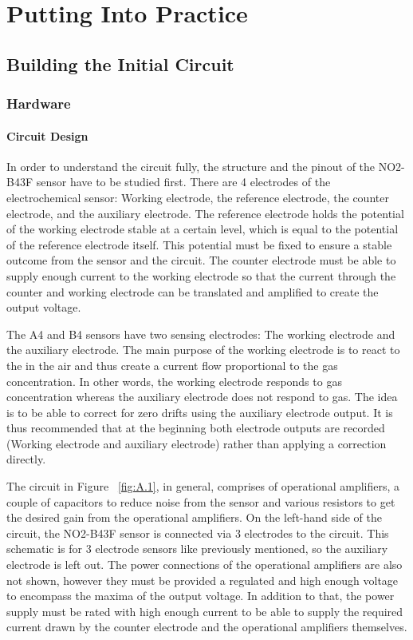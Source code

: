 \chapter{Putting Into Practice}

\section{Building the Initial Circuit}

\subsection{Hardware}
\subsubsection{Circuit Design}
In order to understand the circuit fully, the structure and the pinout of the NO2-B43F sensor have to be studied first. There are 4 electrodes of the electrochemical sensor: Working electrode, the reference electrode, the counter electrode, and the auxiliary electrode. The reference electrode holds the potential of the working electrode stable at a certain level, which is equal to the potential of the reference electrode itself. This potential must be fixed to ensure a stable outcome from the sensor and the circuit. The counter electrode must be able to supply enough current to the working electrode so that the current through the counter and working electrode can be translated and amplified to create the output voltage.\par
The A4 and B4 sensors have two sensing electrodes: The working electrode and the auxiliary electrode. The main purpose of the working electrode is to react to the  in the air and thus create a current flow proportional to the gas concentration. In other words, the working electrode responds to gas concentration whereas the auxiliary electrode does not respond to gas. The idea is to be able to correct for zero drifts using the auxiliary electrode output. It is thus recommended that at the beginning both electrode outputs are recorded (Working electrode and auxiliary electrode) rather than applying a correction directly.\par
The circuit in Figure ~\ref{fig:A.1}, in general, comprises of operational amplifiers, a couple of capacitors to reduce noise from the sensor and various resistors to get the desired gain from the operational amplifiers. On the left-hand side of the circuit, the NO2-B43F sensor is connected via 3 electrodes to the circuit. This schematic is for 3 electrode sensors like previously mentioned, so the auxiliary electrode is left out. The power connections of the operational amplifiers are also not shown, however they must be provided a regulated and high enough voltage to encompass the maxima of the output voltage. In addition to that, the power supply must be rated with high enough current to be able to supply the required current drawn by the counter electrode and the operational amplifiers themselves.\par
